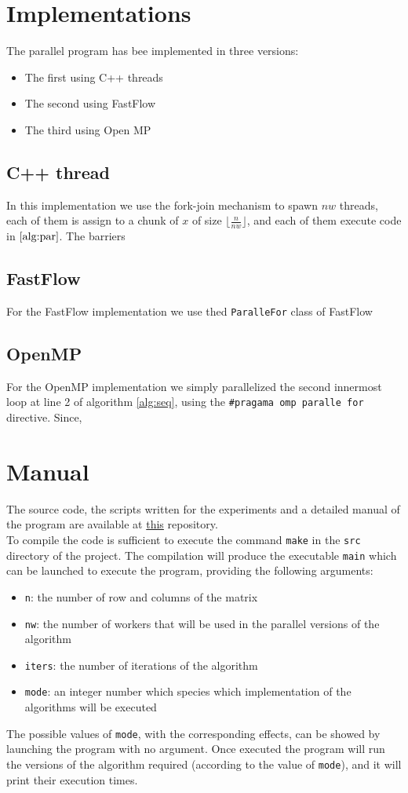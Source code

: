\documentclass[12pt]{article}
\begin{document}
	\section{Implementations}
	The parallel program has bee implemented in three versions:
	\begin{itemize}
		\item The first using C++ threads 
		\item The second using FastFlow
		\item The third using Open MP
	\end{itemize}
	\subsection{C++ thread}
	In this implementation we use the fork-join mechanism to spawn $nw$ threads, each of them is assign to a chunk of $x$ of size $\lfloor\frac{n}{nw}\rfloor$, and each of them execute code in $\ref{alg:par}$. The barriers
	\subsection{FastFlow}
	For the FastFlow implementation we use thed \verb|ParalleFor| class of FastFlow 
	
	\subsection{OpenMP}
	For the OpenMP implementation we simply parallelized the second innermost loop at line 2 of algorithm \ref{alg:seq}, using the \verb|#pragama omp paralle for| directive. Since, 
	\section{Manual}
	The source code, the scripts written for the experiments and a detailed manual of the program are available at \href{https://github.com/DiegoArcelli/Parallel-And-Distributed-Systems-Project}{this} repository.\\ 
	To compile the code is sufficient to execute the command \verb*|make| in the \verb*|src| directory of the project. The compilation will produce the executable \verb*|main| which can be launched to execute the program, providing the following arguments:
	\begin{itemize}
		\item \verb|n|: the number of row and columns of the matrix
		\item \verb|nw|: the number of workers that will be used in the parallel versions of the algorithm
		\item \verb|iters|: the number of iterations of the algorithm
		\item \verb|mode|: an integer number which species which implementation of the algorithms will be executed
	\end{itemize} 
	The possible values of \verb|mode|, with the corresponding effects, can be showed by launching the program with no argument. Once executed the program will run the versions of the algorithm required (according to the value of \verb|mode|), and it will print their execution times. 
	
\end{document}
